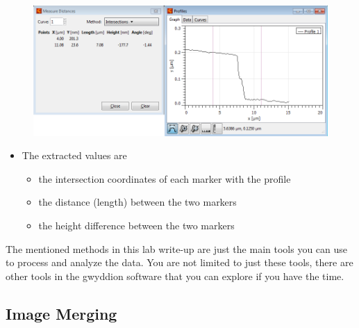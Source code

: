 \documentclass{../lab}
\begin{document}
\begin{itemize}
    \begin{figure}[H]
        \centering
        \href{http://experimentationlab.berkeley.edu/sites/default/files/AFMImages/51.png}{\includegraphics[width=0.5\linewidth]{images/51.png}}
        \caption{}
    \end{figure}
    
    \begin{itemize}
        \item The extracted values are
        \begin{itemize}
            \item the intersection coordinates of each marker with the profile
            \item the distance (length) between the two markers
            \item the height difference between the two markers
        \end{itemize}
    \end{itemize}
    
    The mentioned methods in this lab write-up are just the main tools you can use to process and analyze the data.  You are not limited to just these tools, there are other tools in the gwyddion software that you can explore if you have the time.
\end{itemize}

\subsection{Image Merging}
\label{subsec:ImageMerging}
\end{document}
